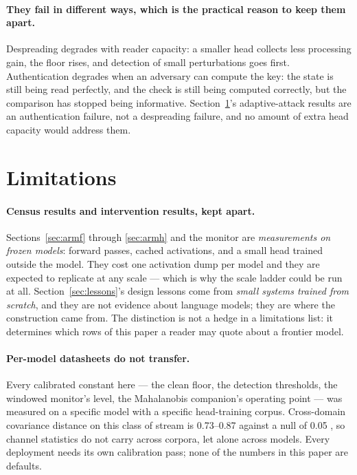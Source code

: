 \documentclass[10pt,twocolumn]{article}
\begin{document}
\paragraph{They fail in different ways, which is the practical reason to keep them
apart.} Despreading degrades with reader capacity: a smaller head collects less
processing gain, the floor rises, and detection of small perturbations goes first.
Authentication degrades when an adversary can compute the key: the state is still
being read perfectly, and the check is still being computed correctly, but the
comparison has stopped being informative. Section~\ref{sec:limits}'s adaptive-attack
results are an authentication failure, not a despreading failure, and no amount of
extra head capacity would address them.

\section{Limitations}\label{sec:limits}
\paragraph{Census results and intervention results, kept apart.} Sections~\ref{sec:armf}
through \ref{sec:armh} and the monitor are \emph{measurements on frozen models}: forward
passes, cached activations, and a small head trained outside the model. They cost one
activation dump per model and they are expected to replicate at any scale --- which is
why the scale ladder could be run at all. Section~\ref{sec:lessons}'s design lessons come
from \emph{small systems trained from scratch}, and they are not evidence about language
models; they are where the construction came from. The distinction is not a hedge in a
limitations list: it determines which rows of this paper a reader may quote about a
frontier model.

\paragraph{Per-model datasheets do not transfer.} Every calibrated constant here --- the
clean floor, the detection thresholds, the windowed monitor's level, the Mahalanobis
companion's operating point --- was measured on a specific model with a specific
head-training corpus. Cross-domain covariance distance on this class of stream is
0.73--0.87 against a null of 0.05 \citep{paper1}, so channel statistics do not carry
across corpora, let alone across models. Every deployment needs its own calibration pass;
none of the numbers in this paper are defaults.
\end{document}
